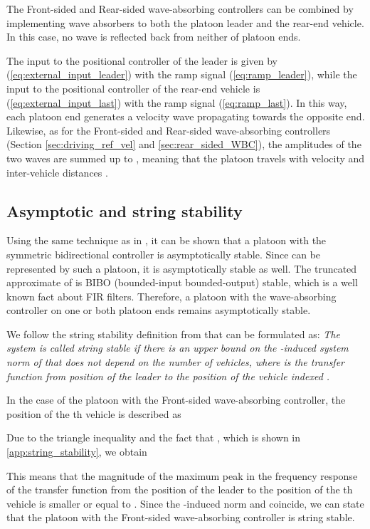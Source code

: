 \documentclass[final,5p,times,twocolumn]{elsarticle}
\begin{document}
The Front-sided and Rear-sided wave-absorbing controllers can be combined by implementing wave absorbers to both the platoon leader and the rear-end vehicle. In this case, no wave is reflected back from neither of platoon ends.

The input to the positional controller of the leader is given by (\ref{eq:external_input_leader}) with the ramp signal (\ref{eq:ramp_leader}), while the input to the positional controller of the rear-end vehicle is (\ref{eq:external_input_last}) with the ramp signal (\ref{eq:ramp_last}). In this way, each platoon end generates a velocity wave propagating towards the opposite end. Likewise, as for the Front-sided and Rear-sided wave-absorbing controllers (Section \ref{sec:driving_ref_vel} and \ref{sec:rear_sided_WBC}), the amplitudes of the two waves are summed up to , meaning that the platoon travels with velocity  and inter-vehicle distances .


\subsection{Asymptotic and string stability}
Using the same technique as in \cite{Herman2013}, it can be shown that a platoon with the symmetric bidirectional controller is asymptotically stable. Since  can be represented by such a platoon, it is asymptotically stable as well. The truncated approximate of  is BIBO (bounded-input bounded-output) stable, which is a well known fact about FIR filters. Therefore, a platoon with the wave-absorbing controller on one or both platoon ends remains asymptotically stable.

We follow the  string stability definition from \cite{Eyre1998a} that can be formulated as:\emph{ The system is called  string stable if there is an upper bound on the -induced system norm of  that does not depend on the number of vehicles, where  is the transfer function from position of the leader to the position of the vehicle indexed .}

In the case of the platoon with the Front-sided wave-absorbing controller, the position of the th vehicle is described as

Due to the triangle inequality and the fact that , which is shown in \ref{app:string_stability}, we obtain

This means that the magnitude of the maximum peak in the frequency response of the transfer function from the position of the leader to the position of the th vehicle is smaller or equal to . Since the -induced norm and  coincide, we can state that the platoon with the Front-sided wave-absorbing controller is  string stable.
\end{document}
